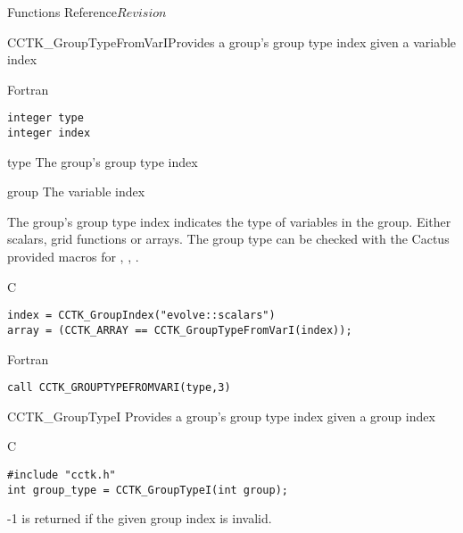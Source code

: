 \begin{cactuspart}{ Functions Reference}{}{$Revision$}
\begin{FunctionDescription}{CCTK\_GroupTypeFromVarI}{Provides a group's group type
               index given a variable index}
\begin{SynopsisSection}
\begin{Synopsis}{Fortran}
\begin{verbatim}
integer type
integer index\end{verbatim}
\end{Synopsis}
\end{SynopsisSection}
\begin{ParameterSection}
\begin{Parameter}{type}
The group's group type index
\end{Parameter}
\begin{Parameter}{group}
The variable index
\end{Parameter}
\end{ParameterSection}
\begin{Discussion}
  The group's group type index indicates the type of variables in the
  group.  Either scalars, grid functions or arrays.  The group type
  can be checked with the Cactus provided macros for
  , , .
\end{Discussion}
\begin{ExampleSection}
\begin{Example}{C}
\begin{verbatim}
index = CCTK_GroupIndex("evolve::scalars")
array = (CCTK_ARRAY == CCTK_GroupTypeFromVarI(index));
\end{verbatim}
\end{Example}
\begin{Example}{Fortran}
\begin{verbatim}
call CCTK_GROUPTYPEFROMVARI(type,3)
\end{verbatim}
\end{Example}
\end{ExampleSection}
\end{FunctionDescription}

\begin{FunctionDescription}{CCTK\_GroupTypeI}{}
\label{CCTK-GroupTypeI}
Provides a group's group type index given a group index
\begin{SynopsisSection}
\begin{Synopsis}{C}
\begin{verbatim}
#include "cctk.h"
int group_type = CCTK_GroupTypeI(int group);
\end{verbatim}
\end{Synopsis}
\end{SynopsisSection}

\begin{ResultSection}
\begin{Result}{-1}
-1 is returned if the given group index is invalid.
\end{Result}
\end{ResultSection}


\end{FunctionDescription}
\end{cactuspart}

